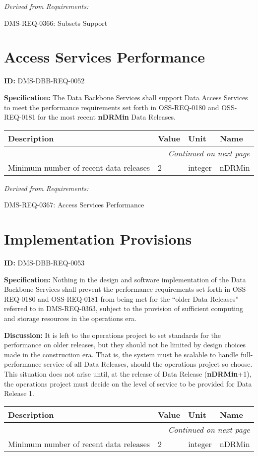 \documentclass[SE,toc,lsstdraft]{lsstdoc}
\makeatletter
\newcommand{\paramname}[1]{\hspace{0pt}#1}
\newcommand{\unitname}[1]{\hspace{0pt}#1}
\newenvironment{parameters}[0]{%
\setlength\LTleft{0pt}
\setlength\LTright{\fill}
\begin{small}
\begin{longtable}[]{|p{0.49\textwidth}|l|p{0.6in}|p{1.70in}@{}|}

\hline \textbf{Description} & \textbf{Value} & \textbf{Unit} & \textbf{Name} \\ \hline
\endhead

\hline \multicolumn{4}{r}{\emph{Continued on next page}} \\
\endfoot

\hline\hline
\endlastfoot
}{%
\hline
\end{longtable}
\end{small}
}
\makeatother
\begin{document}
\emph{Derived from Requirements:}

DMS-REQ-0366:
Subsets Support \newline

\section{Access Services Performance}

\label{DMS-DBB-REQ-0052}
\textbf{ID:} DMS-DBB-REQ-0052

\textbf{Specification:}
The Data Backbone Services shall support Data Access Services to meet the performance requirements set forth in OSS-REQ-0180 and OSS-REQ-0181 for the most recent \textbf{nDRMin} Data Releases.

\begin{parameters}
Minimum number of recent data releases
&
2
&
\unitname{%
integer
}
&
\paramname{%
nDRMin
} \\\hline
\end{parameters}

\emph{Derived from Requirements:}

DMS-REQ-0367:
Access Services Performance \newline

\section{Implementation Provisions}

\label{DMS-DBB-REQ-0053}
\textbf{ID:} DMS-DBB-REQ-0053

\textbf{Specification:}
Nothing in the design and software implementation of the Data Backbone Services shall prevent the performance requirements set forth in OSS-REQ-0180 and OSS-REQ-0181 from being met for the “older Data Releases” referred to in DMS-REQ-0363, subject to the provision of sufficient computing and storage resources in the operations era.

\textbf{Discussion:}
It is left to the operations project to set standards for the performance on older releases, but they should not be limited by design choices made in the construction era. That is, the system must be scalable to handle full-performance service of all Data Releases, should the operations project so choose. This situation does not arise until, at the release of Data Release (\textbf{nDRMin}+1), the operations project must decide on the level of service to be provided for Data Release 1.

\begin{parameters}
Minimum number of recent data releases
&
2
&
\unitname{%
integer
}
&
\paramname{%
nDRMin
} \\\hline
\end{parameters}
\end{document}

